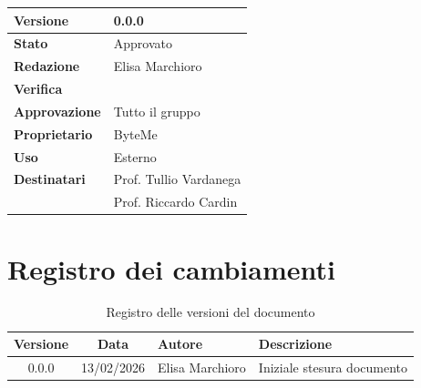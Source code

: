 \documentclass[11pt,a4paper]{article}
\begin{document}
\begin{titlepage}
    \begin{table}[H]
        \centering
        \begin{tabular}{|l|p{5cm}|}
            \hline
            \textbf{Versione} & 0.0.0 \\
            \hline
            \textbf{Stato} & Approvato \\
            \hline
            \textbf{Redazione} & Elisa Marchioro \\
            \hline
            \textbf{Verifica} &  \\
            \hline
            \textbf{Approvazione} & Tutto il gruppo \\
            \hline
            \textbf{Proprietario} & ByteMe \\
            \hline
            \textbf{Uso} & Esterno \\
            \hline
            \textbf{Destinatari} & Prof. Tullio Vardanega \\ & Prof. Riccardo Cardin \\
            \hline
        \end{tabular}
    \end{table}
    
    \vfill
\end{titlepage}

\section*{Registro dei cambiamenti}

\begin{table}[H]
    \centering
    \begin{tabular}{|c|c|>{\raggedright\arraybackslash}p{}|>{\raggedright\arraybackslash}p{}|}
        \hline
        \textbf{Versione} & \textbf{Data} & \textbf{Autore} & \textbf{Descrizione} \\
        \hline
        0.0.0 & 13/02/2026 & Elisa Marchioro & Iniziale stesura documento \\
        \hline
    \end{tabular}
    \caption{Registro delle versioni del documento}
    \label{tab:versionamento}
\end{table}

\newpage

\tableofcontents
\thispagestyle{empty}
\newpage

\setcounter{page}{1}
\end{document}
